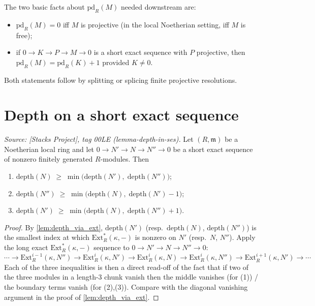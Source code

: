 The two basic facts about \(\text{pd}_R(M)\) needed downstream are:
\begin{itemize}
  \item \(\text{pd}_R(M) = 0\) iff \(M\) is projective (in the local Noetherian setting,
    iff \(M\) is free);
  \item if \(0 \to K \to P \to M \to 0\) is a short exact sequence with \(P\) projective, then
    \(\text{pd}_R(M) = \text{pd}_R(K) + 1\) provided \(K \neq 0\).
\end{itemize}
Both statements follow by splitting or splicing finite projective resolutions.

\section{Depth on a short exact sequence}
\label{sec:ab_depth_ses}

\begin{lemma}\leanok
  \label{lem:depth_short_exact_sequence}

  \textit{Source: [Stacks Project], tag 00LE (lemma-depth-in-ses).}
  Let \((R, \mathfrak{m})\) be a Noetherian local ring and let
  \(0 \to N' \to N \to N'' \to 0\) be a short exact sequence of nonzero finitely generated
  \(R\)-modules. Then
  \begin{enumerate}
    \item \(\text{depth}(N) \;\geq\; \min\bigl(\text{depth}(N'),\; \text{depth}(N'')\bigr)\);
    \item \(\text{depth}(N'') \;\geq\; \min\bigl(\text{depth}(N),\; \text{depth}(N') - 1\bigr)\);
    \item \(\text{depth}(N') \;\geq\; \min\bigl(\text{depth}(N),\; \text{depth}(N'') + 1\bigr)\).
  \end{enumerate}
\end{lemma}

\begin{proof}
  
  
  
  
  
\leanok
  By \cref{lem:depth_via_ext}, \(\text{depth}(N')\) (resp.\ \(\text{depth}(N)\),
  \(\text{depth}(N'')\)) is the smallest index at which \(\text{Ext}^*_R(\kappa, -)\) is
  nonzero on \(N'\) (resp.\ \(N\), \(N''\)). Apply the long exact \(\text{Ext}^*_R(\kappa, -)\)
  sequence to \(0 \to N' \to N \to N'' \to 0\):
  \[
    \cdots \to \text{Ext}^{i-1}_R(\kappa, N'')
    \to \text{Ext}^i_R(\kappa, N')
    \to \text{Ext}^i_R(\kappa, N)
    \to \text{Ext}^i_R(\kappa, N'')
    \to \text{Ext}^{i+1}_R(\kappa, N') \to \cdots
  \]
  Each of the three inequalities is then a direct read-off of the fact that if two
  of the three modules in a length-3 chunk vanish then the middle vanishes (for (1)) /
  the boundary terms vanish (for (2),(3)). Compare with the diagonal vanishing argument in
  the proof of \cref{lem:depth_via_ext}.
\end{proof}

